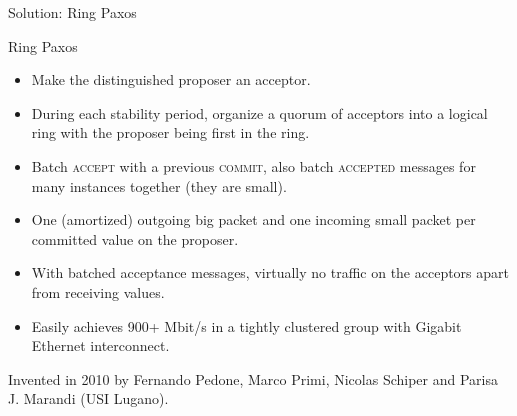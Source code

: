 \documentclass{beamer}
\begin{document}
\begin{frame}{Solution: Ring Paxos}
  \begin{figure}
  \centering
  \end{figure}
\end{frame}

\begin{frame}{Ring Paxos}
  \begin{itemize}
    \item Make the distinguished proposer an acceptor.
    \item During each stability period, organize a quorum of acceptors into a logical ring with the proposer being first in the ring.
    \item Batch \textsc{accept} with a previous \textsc{commit}, also batch \textsc{accepted} messages for many instances together (they are small).
    \item One (amortized) outgoing big packet and one incoming small packet per committed value on the proposer.
    \item With batched acceptance messages, virtually no traffic on the acceptors apart from receiving values.
    \item Easily achieves 900+ Mbit/s in a tightly clustered group with Gigabit Ethernet interconnect.
  \end{itemize}

  Invented in 2010 by Fernando Pedone, Marco Primi, Nicolas Schiper and Parisa J. Marandi (USI Lugano).
\end{frame}
\end{document}
